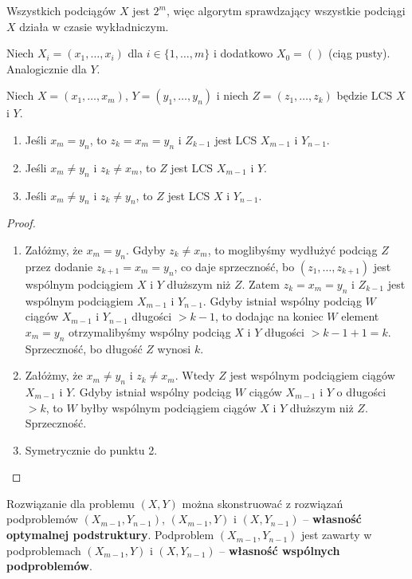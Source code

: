 Wszystkich podciągów $X$ jest $2^m$, więc algorytm sprawdzający wszystkie podciągi $X$ działa w czasie wykładniczym.

Niech $X_i = (x_1, \dots, x_i)$ dla $i \in \{1, \dots, m\}$ i dodatkowo $X_0 = ()$ (ciąg pusty). Analogicznie dla $Y$.

\begin{lemma}
	Niech $X = (x_1, \dots, x_m)$, $Y = (y_1, \dots, y_n)$ i niech $Z = (z_1, \dots, z_k)$ będzie LCS $X$ i $Y$.
	\begin{enumerate}
		\item Jeśli $x_m = y_n$, to $z_k = x_m = y_n$ i $Z_{k-1}$ jest LCS $X_{m-1}$ i $Y_{n-1}$.
		\item Jeśli $x_m \neq y_n$ i $z_k \neq x_m$, to $Z$ jest LCS $X_{m-1}$ i $Y$.
		\item Jeśli $x_m \neq y_n$ i $z_k \neq y_n$, to $Z$ jest LCS $X$ i $Y_{n-1}$.
	\end{enumerate}
\end{lemma}

\begin{proof} ~
	\begin{enumerate}
		\item Załóżmy, że $x_m = y_n$. Gdyby $z_k \neq x_m$, to moglibyśmy wydłużyć podciąg $Z$ przez dodanie $z_{k+1} = x_m = y_n$, co daje sprzeczność, bo $(z_1, \dots, z_{k+1})$ jest wspólnym podciągiem $X$ i $Y$ dłuższym niż $Z$. Zatem $z_k = x_m = y_n$ i $Z_{k-1}$ jest wspólnym podciągiem $X_{m-1}$ i $Y_{n-1}$. Gdyby istniał wspólny podciąg $W$ ciągów $X_{m-1}$ i $Y_{n-1}$ długości $> k - 1$, to dodając na koniec $W$ element $x_m = y_n$ otrzymalibyśmy wspólny podciąg $X$ i $Y$ długości $> k - 1 + 1 = k$. Sprzeczność, bo długość $Z$ wynosi $k$.
		\item Załóżmy, że $x_m \neq y_n$ i $z_k \neq x_m$. Wtedy $Z$ jest wspólnym podciągiem ciągów $X_{m-1}$ i $Y$. Gdyby istniał wspólny podciąg $W$ ciągów $X_{m-1}$ i $Y$ o długości $> k$, to $W$ byłby wspólnym podciągiem ciągów $X$ i $Y$ dłuższym niż $Z$. Sprzeczność.
		\item Symetrycznie do punktu 2.
	\end{enumerate}
\end{proof}

Rozwiązanie dla problemu $(X, Y)$ można skonstruować z rozwiązań podproblemów $(X_{m-1}, Y_{n-1})$, $(X_{m-1}, Y)$ i $(X, Y_{n-1})$ -- \textbf{własność optymalnej podstruktury}. 
Podproblem $(X_{m-1}, Y_{n-1})$ jest zawarty w podproblemach $(X_{m-1}, Y)$ i $(X, Y_{n-1})$ -- \textbf{własność wspólnych podproblemów}.

